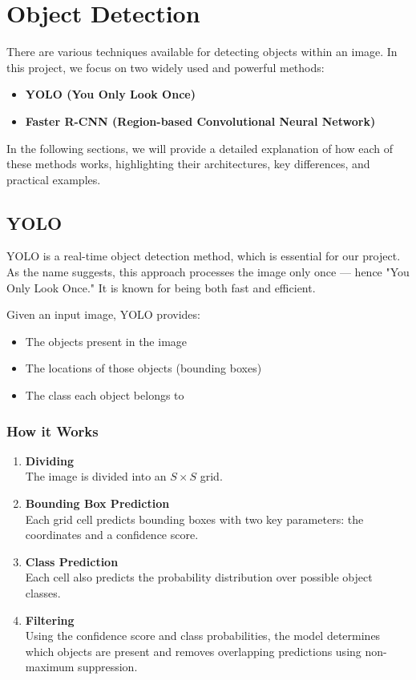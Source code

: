 \documentclass[a4paper,12pt]{article}
\begin{document}
\section{Object Detection}

There are various techniques available for detecting objects within an image. In this project, we focus on two widely used and powerful methods:

\begin{itemize}
    \item \textbf{YOLO (You Only Look Once)}
    \item \textbf{Faster R-CNN (Region-based Convolutional Neural Network)}
\end{itemize}

In the following sections, we will provide a detailed explanation of how each of these methods works, highlighting their architectures, key differences, and practical examples.

\subsection{YOLO}

YOLO is a real-time object detection method, which is essential for our project. As the name suggests, this approach processes the image only once — hence "You Only Look Once." It is known for being both fast and efficient.

Given an input image, YOLO provides:
\begin{itemize}
    \item The objects present in the image
    \item The locations of those objects (bounding boxes)
    \item The class each object belongs to
\end{itemize}

\subsubsection{How it Works}
\begin{enumerate}
    \item \textbf{Dividing} \\ 
    The image is divided into an \(S \times S\) grid.
    
    \item \textbf{Bounding Box Prediction} \\ 
    Each grid cell predicts bounding boxes with two key parameters: the coordinates and a confidence score.
    
    \item \textbf{Class Prediction} \\ 
    Each cell also predicts the probability distribution over possible object classes.
    
    \item \textbf{Filtering} \\ 
    Using the confidence score and class probabilities, the model determines which objects are present and removes overlapping predictions using non-maximum suppression.
\end{enumerate}
\end{document}
